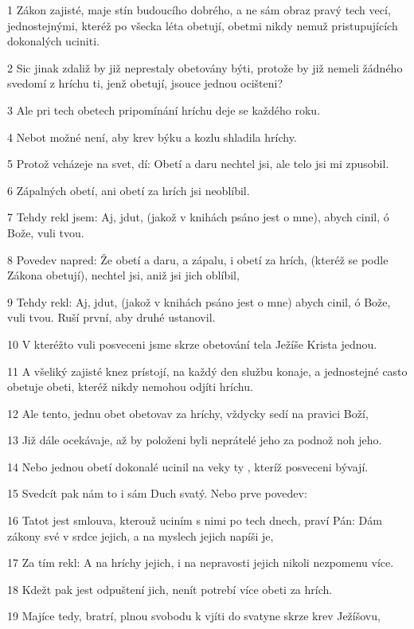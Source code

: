 \par 1 Zákon zajisté, maje stín budoucího dobrého, a ne sám obraz pravý tech vecí, jednostejnými, kteréž po všecka léta obetují, obetmi nikdy nemuž pristupujících dokonalých uciniti.
\par 2 Sic jinak zdaliž by již neprestaly obetovány býti, protože by již nemeli žádného svedomí z hríchu ti, jenž obetují, jsouce jednou ocišteni?
\par 3 Ale pri tech obetech pripomínání hríchu deje se každého roku.
\par 4 Nebot možné není, aby krev býku a kozlu shladila hríchy.
\par 5 Protož vcházeje na svet, dí: Obetí a daru nechtel jsi, ale telo jsi mi zpusobil.
\par 6 Zápalných obetí, ani obetí za hrích jsi neoblíbil.
\par 7 Tehdy rekl jsem: Aj, jdut, (jakož v knihách psáno jest o mne), abych cinil, ó Bože, vuli tvou.
\par 8 Povedev napred: Že obetí a daru, a zápalu, i obetí za hrích, (kteréž se podle Zákona obetují), nechtel jsi, aniž jsi jich oblíbil,
\par 9 Tehdy rekl: Aj, jdut, (jakož v knihách psáno jest o mne) abych cinil, ó Bože, vuli tvou. Ruší první, aby druhé ustanovil.
\par 10 V kteréžto vuli posveceni jsme skrze obetování tela Ježíše Krista jednou.
\par 11 A všeliký zajisté knez prístojí, na každý den službu konaje, a jednostejné casto obetuje obeti, kteréž nikdy nemohou odjíti hríchu.
\par 12 Ale tento, jednu obet obetovav za hríchy, vždycky sedí na pravici Boží,
\par 13 Již dále ocekávaje, až by položeni byli neprátelé jeho za podnož noh jeho.
\par 14 Nebo jednou obetí dokonalé ucinil na veky ty , kteríž posveceni bývají.
\par 15 Svedcít pak nám to i sám Duch svatý. Nebo prve povedev:
\par 16 Tatot jest smlouva, kterouž uciním s nimi po tech dnech, praví Pán: Dám zákony své v srdce jejich, a na myslech jejich napíši je,
\par 17 Za tím rekl: A na hríchy jejich, i na nepravosti jejich nikoli nezpomenu více.
\par 18 Kdežt pak jest odpuštení jich, nenít potrebí více obeti za hrích.
\par 19 Majíce tedy, bratrí, plnou svobodu k vjíti do svatyne skrze krev Ježíšovu,
